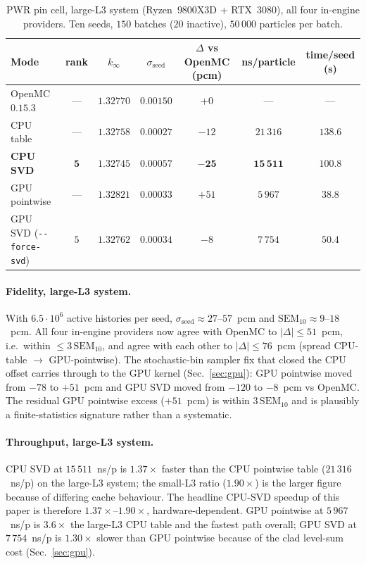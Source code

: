 \begin{table}[t]
\centering
\caption{PWR pin cell, large-L3 system (Ryzen~$9800$X3D +
RTX~$3080$), all four in-engine providers. Ten seeds,
$150$ batches ($20$ inactive), $50\,000$ particles per
batch.}
\label{tab:keff_pwr_desktop}
\begin{tabular}{@{}lcccccc@{}}
\toprule
Mode & rank & $k_\infty$ & $\sigma_\text{seed}$ &
$\Delta$ vs OpenMC (pcm) & ns/particle & time/seed (s) \\
\midrule
OpenMC $0.15.3$                      & ---  & $1.32770$ & $0.00150$ & $+0$  & ---       & ---    \\
CPU table                            & ---  & $1.32758$ & $0.00027$ & $-12$ & $21\,316$ & $138.6$ \\
\textbf{CPU SVD}                     & $\mathbf{5}$ & $\mathbf{1.32745}$ &
 $\mathbf{0.00057}$ & $\mathbf{-25}$ & $\mathbf{15\,511}$ & $\mathbf{100.8}$ \\
GPU pointwise                        & ---  & $1.32821$ & $0.00033$ & $+51$ & $5\,967$  & $38.8$  \\
GPU SVD (\texttt{-{}-force-svd})     & $5$  & $1.32762$ & $0.00034$ & $-8$  & $7\,754$  & $50.4$  \\
\bottomrule
\end{tabular}
\end{table}

\paragraph{Fidelity, large-L3 system.}
With $6.5 \cdot 10^6$ active histories per seed,
$\sigma_\text{seed} \approx 27$--$57$~pcm and
$\mathrm{SEM}_{10} \approx 9$--$18$~pcm. All four in-engine
providers now agree with OpenMC to $|\Delta| \le 51$~pcm,
i.e.\ within $\le 3\,\mathrm{SEM}_{10}$, and agree with each
other to $|\Delta| \le 76$~pcm
(spread CPU-table $\to$ GPU-pointwise).
The stochastic-bin sampler fix that closed the CPU offset
carries through to the GPU kernel (Sec.~\ref{sec:gpu}): GPU
pointwise moved from $-78$ to $+51$~pcm and GPU SVD moved
from $-120$ to $-8$~pcm vs OpenMC. The residual GPU
pointwise excess ($+51$~pcm) is within
$3\,\mathrm{SEM}_{10}$ and is plausibly a finite-statistics
signature rather than a systematic.

\paragraph{Throughput, large-L3 system.}
CPU SVD at $15\,511$~ns/p is $1.37\times$ faster than the
CPU pointwise table ($21\,316$~ns/p) on the large-L3 system;
the small-L3 ratio ($1.90\times$) is the larger figure because
of differing cache behaviour. The headline CPU-SVD speedup
of this paper is therefore
$1.37\times$--$1.90\times$, hardware-dependent.
GPU pointwise at $5\,967$~ns/p is $3.6\times$ the large-L3
CPU table and the fastest path overall; GPU SVD at
$7\,754$~ns/p is $1.30\times$ slower than GPU pointwise
because of the clad level-sum cost (Sec.~\ref{sec:gpu}).

